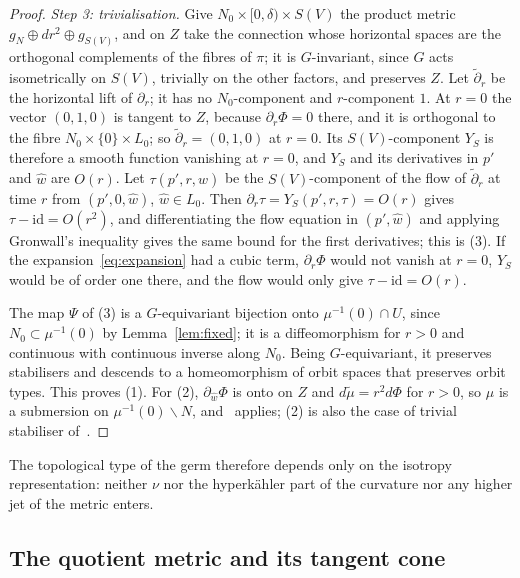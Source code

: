 \begin{proof}
\emph{Step 3: trivialisation.} Give $N_0\times[0,\delta)\times S(V)$ the product metric
$g_N\oplus dr^2\oplus g_{S(V)}$, and on $Z$ take the connection whose horizontal spaces are the
orthogonal complements of the fibres of $\pi$; it is $G$-invariant, since $G$ acts isometrically
on $S(V)$, trivially on the other factors, and preserves $Z$. Let $\widetilde\partial_r$ be the
horizontal lift of $\partial_r$; it has no $N_0$-component and $r$-component $1$. At $r=0$ the vector $(0,1,0)$ is
tangent to $Z$, because $\partial_r\Phi=0$ there, and it is orthogonal to the fibre
$N_0\times\{0\}\times L_0$; so $\widetilde\partial_r=(0,1,0)$ at $r=0$. Its $S(V)$-component
$Y_S$ is therefore a smooth function vanishing at $r=0$, and $Y_S$ and its derivatives in $p'$
and $\hat w$ are $O(r)$. Let $\tau(p',r,\hat w)$ be the $S(V)$-component of the flow of
$\widetilde\partial_r$ at time $r$ from $(p',0,\hat w)$, $\hat w\in L_0$. Then
$\partial_r\tau=Y_S(p',r,\tau)=O(r)$ gives
$\tau-\mathrm{id}=O(r^2)$, and differentiating the flow equation in $(p',\hat w)$ and applying
Gronwall's inequality gives the same bound for the first derivatives; this is (3). If the
expansion~\eqref{eq:expansion} had a cubic term, $\partial_r\Phi$ would not vanish at $r=0$, $Y_S$
would be of order one there, and the flow would only give $\tau-\mathrm{id}=O(r)$.

The map $\Psi$ of (3) is a $G$-equivariant bijection onto $\mu^{-1}(0)\cap U$, since
$N_0\subset\mu^{-1}(0)$ by Lemma~\ref{lem:fixed}; it is a diffeomorphism for $r>0$ and
continuous with continuous inverse along $N_0$. Being $G$-equivariant, it preserves stabilisers
and descends to a homeomorphism of orbit spaces that preserves orbit types. This proves (1). For (2),
$\partial_{\hat w}\Phi$ is onto on $Z$ and $d\widetilde\mu=r^2d\Phi$ for $r>0$, so $\mu$ is a
submersion on $\mu^{-1}(0)\smallsetminus N$, and~\cite[Thm.~3.1]{Galicki:1988} applies; (2) is also the
case of trivial stabiliser of~\cite[Prop.~4.4]{DancerSwann:1997}.
\end{proof}

The topological type of the germ therefore depends only on the isotropy representation: neither
$\nu$ nor the hyperk\"ahler part of the curvature nor any higher jet of the metric enters.

\subsection{The quotient metric and its tangent cone}
\label{subsec:tangent-cone}

